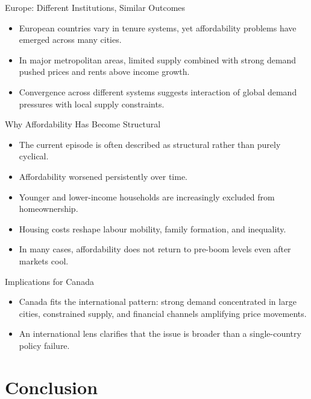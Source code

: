 \documentclass[aspectratio=169]{beamer}
\begin{document}
\begin{frame}{Europe: Different Institutions, Similar Outcomes}
\transfade
\begin{itemize}
  \item European countries vary in tenure systems, yet affordability problems have emerged across many cities.
  \item In major metropolitan areas, limited supply combined with strong demand pushed prices and rents above income growth.
  \item Convergence across different systems suggests interaction of global demand pressures with local supply constraints.
\end{itemize}
\end{frame}

\begin{frame}{Why Affordability Has Become Structural}
\transfade
\begin{itemize}
  \item The current episode is often described as structural rather than purely cyclical.
  \item Affordability worsened persistently over time.
  \item Younger and lower-income households are increasingly excluded from homeownership.
  \item Housing costs reshape labour mobility, family formation, and inequality.
  \item In many cases, affordability does not return to pre-boom levels even after markets cool.
\end{itemize}
\end{frame}

\begin{frame}{Implications for Canada}
\transfade
\begin{itemize}
  \item Canada fits the international pattern: strong demand concentrated in large cities, constrained supply, and financial channels amplifying price movements.
  \item An international lens clarifies that the issue is broader than a single-country policy failure.
\end{itemize}
\end{frame}

\section{Conclusion}
\end{document}

